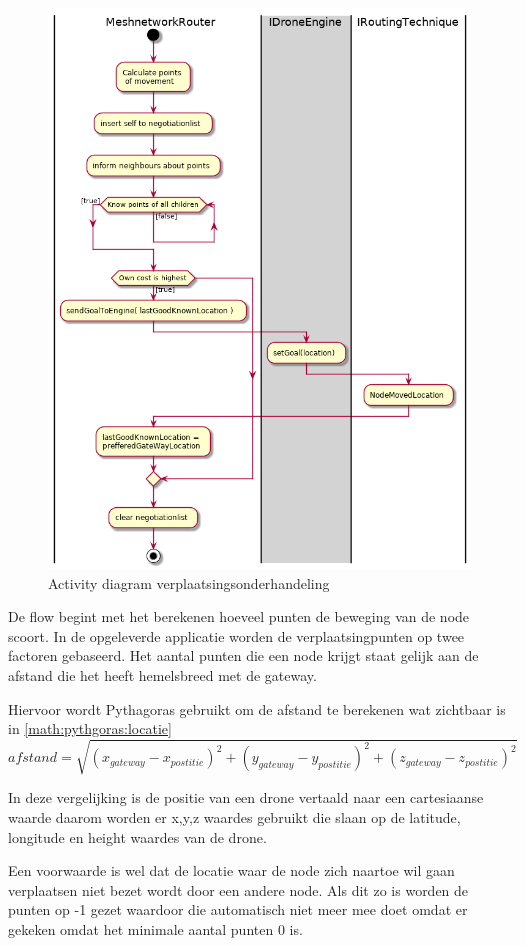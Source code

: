 \documentclass[a4paper, 11pt, oneside]{report}
\begin{document}
\begin{figure}[H]
	\begin{center}\includegraphics[width=.6\linewidth]{UML/out/Communication/activity/MovementNegotiation/MovementNegotiation.png}\end{center}
	\caption{Activity diagram verplaatsingsonderhandeling}
	\label{fig:communication:activity:verplaatsingsonderhandeling}
\end{figure}
De flow begint met het berekenen hoeveel punten de beweging van de node scoort.
In de opgeleverde applicatie worden de verplaatsingpunten op twee factoren gebaseerd.
Het aantal punten die een node krijgt staat gelijk aan de afstand die het heeft hemelsbreed met de gateway.

Hiervoor wordt Pythagoras gebruikt om de afstand te berekenen wat zichtbaar is in \autoref{math:pythgoras:locatie} 
\begin{equation}
\label{math:pythgoras:locatie}
afstand =   \sqrt{(x_{gateway} - x_{postitie})^2+(y_{gateway} - y_{postitie})^2+(z_{gateway} - z_{postitie})^2}							
\end{equation}

In deze vergelijking is de positie van een drone vertaald naar een cartesiaanse waarde daarom worden er x,y,z waardes gebruikt die slaan op de latitude, longitude en height waardes van de drone.

Een voorwaarde is wel dat de locatie waar de node zich naartoe wil gaan verplaatsen niet bezet wordt door een andere node. Als dit zo is worden de punten op -1 gezet waardoor die automatisch niet meer mee doet omdat er gekeken omdat het minimale aantal punten 0 is.
\end{document}
